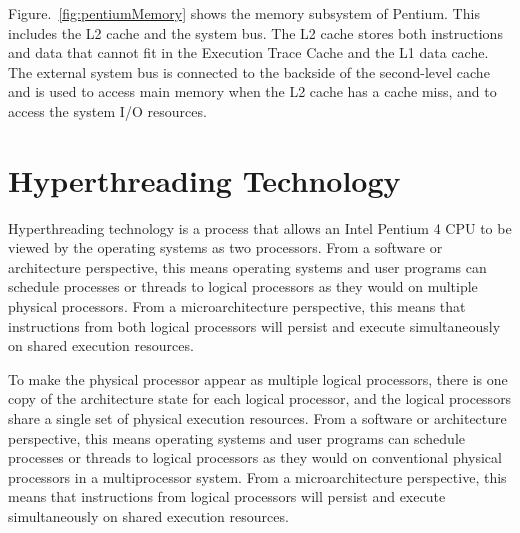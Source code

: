 \documentclass[doc,natbib,12pt]{apa6}
\begin{document}
	Figure.~\vref{fig:pentiumMemory} shows the memory subsystem of Pentium. This includes the L2 cache and the system bus. The L2 cache stores both instructions and data that cannot fit in the Execution Trace Cache and the L1 data cache. The external system bus is connected to the backside of the second-level cache and is used to access main memory when the L2 cache has a cache miss, and to access the system I/O resources. \citep{Hinton2001}
	
	
	
	
	
	\newpage
	\section{Hyperthreading Technology} \label{chp:hyperthreadingTechnology}
	
	Hyperthreading technology is a process that allows an Intel Pentium 4 CPU to be viewed by the operating systems as two processors. From a software or architecture perspective, this means operating systems and user programs can schedule processes or threads to logical processors as they would on multiple physical processors. From a microarchitecture perspective, this means that instructions from both logical processors will persist and execute simultaneously on shared execution resources. \citep{Marr2002}
	
	To make the physical processor appear as multiple logical processors, there is one copy of the architecture state for each logical processor, and the logical processors share a single set of physical execution resources. From a software or architecture perspective, this means operating systems and user programs can schedule processes or threads to logical processors as they would on conventional physical processors in a multiprocessor system. From a microarchitecture perspective, this means that instructions from logical processors will persist and execute simultaneously on shared execution resources. \citep{Marr2002}
	
\end{document}
